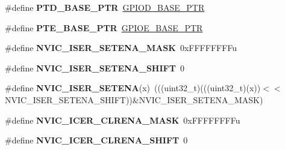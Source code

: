 \begin{DoxyCompactItemize}
\item 
\mbox{\label{group___backward___compatibility___symbols_gaa61d2c33375f3becbae1353eee4c1317}} 
\#define {\bfseries P\+T\+D\+\_\+\+B\+A\+S\+E\+\_\+\+P\+TR}~\hyperlink{group___g_p_i_o___peripheral_ga080871bcecac6697912c87d4af0a8298}{G\+P\+I\+O\+D\+\_\+\+B\+A\+S\+E\+\_\+\+P\+TR}
\item 
\mbox{\label{group___backward___compatibility___symbols_gaa230685f72ad1540850ab8d12366775c}} 
\#define {\bfseries P\+T\+E\+\_\+\+B\+A\+S\+E\+\_\+\+P\+TR}~\hyperlink{group___g_p_i_o___peripheral_ga5d17758f0829d938753761d4a53c0a7c}{G\+P\+I\+O\+E\+\_\+\+B\+A\+S\+E\+\_\+\+P\+TR}
\item 
\mbox{\label{group___backward___compatibility___symbols_ga7e67471c208e3986c0cdd8e7e1319a30}} 
\#define {\bfseries N\+V\+I\+C\+\_\+\+I\+S\+E\+R\+\_\+\+S\+E\+T\+E\+N\+A\+\_\+\+M\+A\+SK}~0x\+F\+F\+F\+F\+F\+F\+F\+Fu
\item 
\mbox{\label{group___backward___compatibility___symbols_ga9965b5df5f4c6c8d3a1c8e89d03d9489}} 
\#define {\bfseries N\+V\+I\+C\+\_\+\+I\+S\+E\+R\+\_\+\+S\+E\+T\+E\+N\+A\+\_\+\+S\+H\+I\+FT}~0
\item 
\mbox{\label{group___backward___compatibility___symbols_ga8ab1a05215cc61b33eac1d6c4b00b704}} 
\#define {\bfseries N\+V\+I\+C\+\_\+\+I\+S\+E\+R\+\_\+\+S\+E\+T\+E\+NA}(x)~(((uint32\+\_\+t)(((uint32\+\_\+t)(x))$<$$<$N\+V\+I\+C\+\_\+\+I\+S\+E\+R\+\_\+\+S\+E\+T\+E\+N\+A\+\_\+\+S\+H\+I\+FT))\&N\+V\+I\+C\+\_\+\+I\+S\+E\+R\+\_\+\+S\+E\+T\+E\+N\+A\+\_\+\+M\+A\+SK)
\item 
\mbox{\label{group___backward___compatibility___symbols_gad8da511197e454095edbfeb501e8b2f5}} 
\#define {\bfseries N\+V\+I\+C\+\_\+\+I\+C\+E\+R\+\_\+\+C\+L\+R\+E\+N\+A\+\_\+\+M\+A\+SK}~0x\+F\+F\+F\+F\+F\+F\+F\+Fu
\item 
\mbox{\label{group___backward___compatibility___symbols_ga35b241c6ab2dbf18cf15503076dcb9a8}} 
\#define {\bfseries N\+V\+I\+C\+\_\+\+I\+C\+E\+R\+\_\+\+C\+L\+R\+E\+N\+A\+\_\+\+S\+H\+I\+FT}~0
$$
\end{DoxyCompactItemize}
